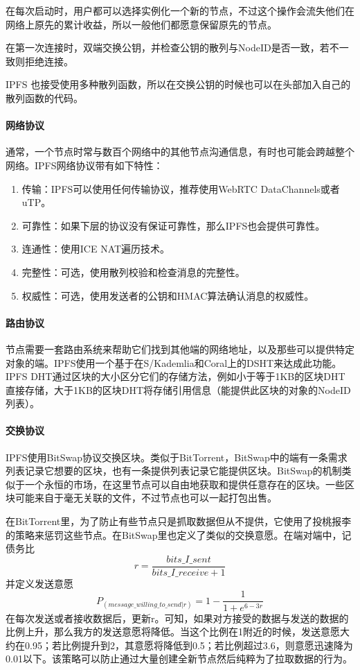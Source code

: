 \documentclass{ctexart}
\begin{document}
在每次启动时，用户都可以选择实例化一个新的节点，不过这个操作会流失他们在网络上原先的累计收益，所以一般他们都愿意保留原先的节点。

在第一次连接时，双端交换公钥，并检查公钥的散列与NodeID是否一致，若不一致则拒绝连接。

IPFS 也接受使用多种散列函数，所以在交换公钥的时候也可以在头部加入自己的散列函数的代码。
\paragraph{网络协议}
通常，一个节点时常与数百个网络中的其他节点沟通信息，有时也可能会跨越整个网络。IPFS网络协议带有如下特性：
\begin{enumerate}
	\item 传输：IPFS可以使用任何传输协议，推荐使用WebRTC DataChannels或者uTP。
	\item 可靠性：如果下层的协议没有保证可靠性，那么IPFS也会提供可靠性。
	\item 连通性：使用ICE NAT遍历技术。
	\item 完整性：可选，使用散列校验和检查消息的完整性。
	\item 权威性：可选，使用发送者的公钥和HMAC算法确认消息的权威性。
\end{enumerate}
\paragraph{路由协议}
节点需要一套路由系统来帮助它们找到其他端的网络地址，以及那些可以提供特定对象的端。IPFS使用一个基于在S/Kademlia和Coral上的DSHT来达成此功能。IPFS DHT通过区块的大小区分它们的存储方法，例如小于等于1KB的区块DHT直接存储，大于1KB的区块DHT将存储引用信息（能提供此区块的对象的NodeID列表）。
\paragraph{交换协议}
IPFS使用BitSwap协议交换区块。类似于BitTorrent，BitSwap中的端有一条需求列表记录它想要的区块，也有一条提供列表记录它能提供区块。BitSwap的机制类似于一个永恒的市场，在这里节点可以自由地获取和提供任意存在的区块。一些区块可能来自于毫无关联的文件，不过节点也可以一起打包出售。

在BitTorrent里，为了防止有些节点只是抓取数据但从不提供，它使用了投桃报李的策略来惩罚这些节点。在BitSwap里也定义了类似的交换意愿。在端对端中，记债务比
\[
	r = \frac{bits\_I\_sent}{bits\_I\_receive+1}
\]并定义发送意愿
\[ P_{(message\_willing\_to\_send|r)} = 1 - \frac{1}{1+e^{6-3r}}
\]
在每次发送或者接收数据后，更新r。可知，如果对方接受的数据与发送的数据的比例上升，那么我方的发送意愿将降低。当这个比例在1附近的时候，发送意愿大约在0.95；若比例提升到2，其意愿将降低到0.5；若比例超过3.6，则意愿迅速降为0.01以下。该策略可以防止通过大量创建全新节点然后纯粹为了拉取数据的行为。
\end{document}
